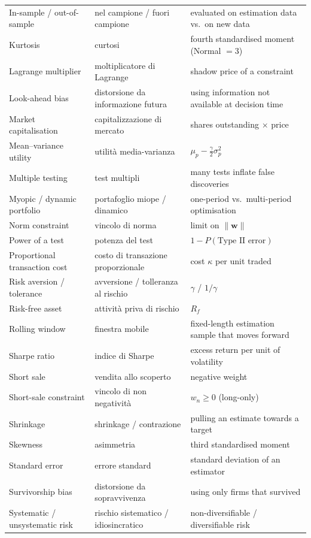 \documentclass[11pt,a4paper]{report}
\newcommand{\w}{\bm{w}}
\begin{document}
{\begin{longtable}{@{}p{4.2cm}p{4.2cm}p{6.6cm}@{}}
In-sample / out-of-sample & nel campione / fuori campione & evaluated on estimation data vs.\ on new data \\
Kurtosis & curtosi & fourth standardised moment (Normal $=3$) \\
Lagrange multiplier & moltiplicatore di Lagrange & shadow price of a constraint \\
Look-ahead bias & distorsione da informazione futura & using information not available at decision time \\
Market capitalisation & capitalizzazione di mercato & shares outstanding $\times$ price \\
Mean--variance utility & utilità media-varianza & $\mu_p-\frac\gamma2\sigma_p^2$ \\
Multiple testing & test multipli & many tests inflate false discoveries \\
Myopic / dynamic portfolio & portafoglio miope / dinamico & one-period vs.\ multi-period optimisation \\
Norm constraint & vincolo di norma & limit on $\|\w\|$ \\
Power of a test & potenza del test & $1-P(\text{Type II error})$ \\
Proportional transaction cost & costo di transazione proporzionale & cost $\kappa$ per unit traded \\
Risk aversion / tolerance & avversione / tolleranza al rischio & $\gamma$ / $1/\gamma$ \\
Risk-free asset & attività priva di rischio & $R_f$ \\
Rolling window & finestra mobile & fixed-length estimation sample that moves forward \\
Sharpe ratio & indice di Sharpe & excess return per unit of volatility \\
Short sale & vendita allo scoperto & negative weight \\
Short-sale constraint & vincolo di non negatività & $w_n\ge0$ (long-only) \\
Shrinkage & shrinkage / contrazione & pulling an estimate towards a target \\
Skewness & asimmetria & third standardised moment \\
Standard error & errore standard & standard deviation of an estimator \\
Survivorship bias & distorsione da sopravvivenza & using only firms that survived \\
Systematic / unsystematic risk & rischio sistematico / idiosincratico & non-diversifiable / diversifiable risk \\

\end{longtable}}
\end{document}

